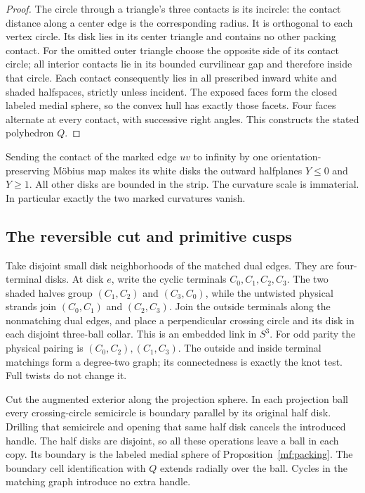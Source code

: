 \documentclass[11pt]{article}
\numberwithin{equation}{section}
\theoremstyle{definition}
\theoremstyle{remark}
\begin{document}
\begin{proof}
The circle through a triangle's three contacts is its incircle:
the contact distance along a center edge is the corresponding radius.
It is orthogonal to each vertex circle. Its disk lies in its center
triangle and contains no other packing contact. For the omitted outer
triangle choose the opposite side of its contact circle; all interior
contacts lie in its bounded curvilinear gap and therefore inside that
circle. Each contact consequently lies in all prescribed inward white
and shaded halfspaces, strictly unless incident. The exposed faces
form the closed labeled medial sphere, so the convex hull has exactly
those facets. Four faces alternate at every contact, with successive
right angles. This constructs the stated polyhedron \(Q\).
\end{proof}

Sending the contact of the marked edge \(uv\) to infinity by one
orientation-preserving Möbius map makes its white disks the outward
halfplanes \(Y\le0\) and \(Y\ge1\). All other disks are bounded in the
strip. The curvature scale is immaterial. In particular exactly the
two marked curvatures vanish.

\subsection{The reversible cut and primitive cusps}

Take disjoint small disk neighborhoods of the matched dual edges.
They are four-terminal disks. At disk \(e\), write the cyclic
terminals \(C_0,C_1,C_2,C_3\). The two shaded halves group
\((C_1,C_2)\) and \((C_3,C_0)\), while the untwisted physical
strands join \((C_0,C_1)\) and \((C_2,C_3)\).
Join the outside terminals along the nonmatching dual edges, and
place a perpendicular crossing circle and its disk in each disjoint
three-ball collar. This is an embedded link in \(S^3\).
For odd parity the physical pairing is
\((C_0,C_2),(C_1,C_3)\).
The outside and inside terminal matchings form a degree-two graph;
its connectedness is exactly the knot test. Full twists do not change it.

Cut the augmented exterior along the projection sphere. In each
projection ball every crossing-circle semicircle is boundary parallel
by its original half disk. Drilling that semicircle and opening that
same half disk cancels the introduced handle. The half disks are
disjoint, so all these operations leave a ball in each copy.
Its boundary is the labeled medial sphere of Proposition~\ref{mf:packing}.
The boundary cell identification with \(Q\) extends radially over
the ball. Cycles in the matching graph introduce no extra handle.
\end{document}
